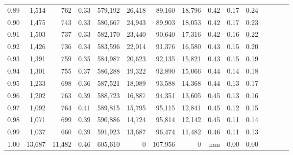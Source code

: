 \begin{tabular}{rrrcrrrrrrrrrrr}
0.89 &   1,514 &     762 &                                       0.33 &  579,192 &   26,418 &   89,160 &   18,796 &  0.42 &  0.17 &                         0.24 \\
0.90 &   1,475 &     743 &                                       0.33 &  580,667 &   24,943 &   89,903 &   18,053 &  0.42 &  0.17 &                         0.23 \\
0.91 &   1,503 &     737 &                                       0.33 &  582,170 &   23,440 &   90,640 &   17,316 &  0.42 &  0.16 &                         0.22 \\
0.92 &   1,426 &     736 &                                       0.34 &  583,596 &   22,014 &   91,376 &   16,580 &  0.43 &  0.15 &                         0.20 \\
0.93 &   1,391 &     759 &                                       0.35 &  584,987 &   20,623 &   92,135 &   15,821 &  0.43 &  0.15 &                         0.19 \\
0.94 &   1,301 &     755 &                                       0.37 &  586,288 &   19,322 &   92,890 &   15,066 &  0.44 &  0.14 &                         0.18 \\
0.95 &   1,233 &     698 &                                       0.36 &  587,521 &   18,089 &   93,588 &   14,368 &  0.44 &  0.13 &                         0.17 \\
0.96 &   1,202 &     763 &                                       0.39 &  588,723 &   16,887 &   94,351 &   13,605 &  0.45 &  0.13 &                         0.16 \\
0.97 &   1,092 &     764 &                                       0.41 &  589,815 &   15,795 &   95,115 &   12,841 &  0.45 &  0.12 &                         0.15 \\
0.98 &   1,071 &     699 &                                       0.39 &  590,886 &   14,724 &   95,814 &   12,142 &  0.45 &  0.11 &                         0.14 \\
0.99 &   1,037 &     660 &                                       0.39 &  591,923 &   13,687 &   96,474 &   11,482 &  0.46 &  0.11 &                         0.13 \\
1.00 &  13,687 &  11,482 &                                       0.46 &  605,610 &        0 &  107,956 &        0 &   nan &  0.00 &                         0.00 \\
\bottomrule
\end{tabular}
